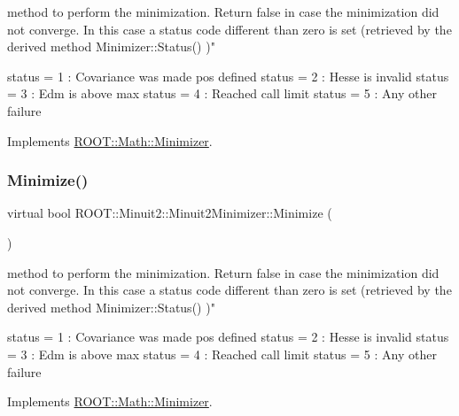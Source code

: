 method to perform the minimization. Return false in case the minimization did not converge. In this case a status code different than zero is set (retrieved by the derived method Minimizer\+::\+Status() )"

status = 1 \+: Covariance was made pos defined status = 2 \+: Hesse is invalid status = 3 \+: Edm is above max status = 4 \+: Reached call limit status = 5 \+: Any other failure 

Implements \mbox{\hyperlink{classROOT_1_1Math_1_1Minimizer_a5f6a6307935a17fb13dac1ee7f1c41fd}{R\+O\+O\+T\+::\+Math\+::\+Minimizer}}.

\mbox{\label{classROOT_1_1Minuit2_1_1Minuit2Minimizer_af5d2da195d2b1a7eac6d9b8859eec2b9}} 
\subsubsection{\texorpdfstring{Minimize()}{Minimize()}\hspace{0.1cm}{\footnotesize\ttfamily [3/3]}}
{\footnotesize\ttfamily virtual bool R\+O\+O\+T\+::\+Minuit2\+::\+Minuit2\+Minimizer\+::\+Minimize (\begin{DoxyParamCaption}{ }\end{DoxyParamCaption})\hspace{0.3cm}{\ttfamily [virtual]}}

method to perform the minimization. Return false in case the minimization did not converge. In this case a status code different than zero is set (retrieved by the derived method Minimizer\+::\+Status() )"

status = 1 \+: Covariance was made pos defined status = 2 \+: Hesse is invalid status = 3 \+: Edm is above max status = 4 \+: Reached call limit status = 5 \+: Any other failure 

Implements \mbox{\hyperlink{classROOT_1_1Math_1_1Minimizer_a5f6a6307935a17fb13dac1ee7f1c41fd}{R\+O\+O\+T\+::\+Math\+::\+Minimizer}}.

\mbox{\label{classROOT_1_1Minuit2_1_1Minuit2Minimizer_a4a1c7fc174527aefab3d8c87bf8c0672}} 

